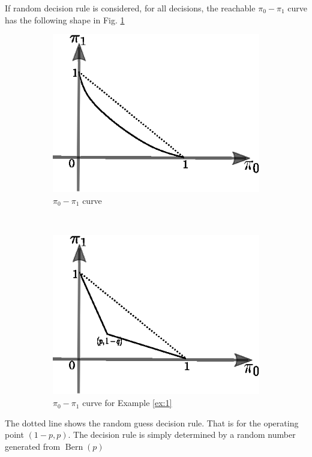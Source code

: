 \documentclass{article}
\DeclareMathOperator{\Bern}{Bern}
\begin{document}
If random decision rule is considered,
for all decisions, the reachable $\pi_0-\pi_1$ curve
has the following shape in Fig. \ref{fig:pi01}
\begin{figure}[!ht]
\begin{subfigure}{0.45\textwidth}
    \centering
    \includegraphics{pi0pi1.eps}
    \caption{$\pi_0-\pi_1$ curve}
    \label{fig:pi01}
\end{subfigure}~
\begin{subfigure}{0.45\textwidth}
    \centering
    \includegraphics{pi0pi1_bern.eps}
    \caption{$\pi_0-\pi_1$ curve for Example \ref{ex:1}}
    \label{fig:pi01_bern}
\end{subfigure}
\caption{}
\end{figure}
The dotted line shows the random guess decision
rule. That is for the operating point $(1-p,p)$.
The decision rule is simply determined by a random number generated from $\Bern(p)$
\end{document}
